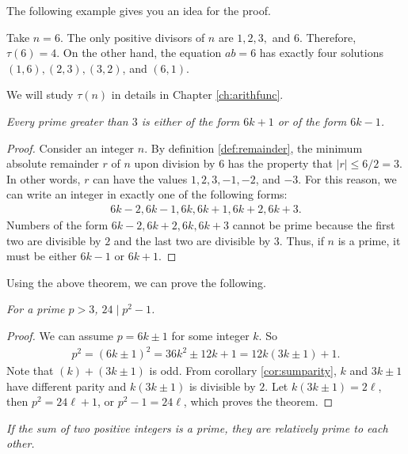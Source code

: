 \documentclass{subfile}
\begin{document}
	The following example gives you an idea for the proof.

	\begin{example}
		Take $n=6$. The only positive divisors of $n$ are $1,2,3,$ and $6$. Therefore, $\tau(6)=4$. On the other hand, the equation $ab=6$ has exactly four solutions $(1,6), (2,3),(3,2)$, and $(6,1)$.
	\end{example}

	We will study $\tau(n)$ in details in Chapter \autoref{ch:arithfunc}.

	\begin{theorem}\slshape
		Every prime greater than $3$ is either of the form $6k+1$ or of the form $6k-1$.
	\end{theorem}

	\begin{proof}
		Consider an integer $n$. By definition \eqref{def:remainder}, the minimum absolute remainder $r$ of $n$ upon division by $6$ has the property that $|r| \leq 6/2=3$. In other words, $r$ can have the values $1,2,3,-1,-2$, and $-3$. For this reason, we can write an integer in exactly one of the following forms:
		\begin{align*}
			6k-2,6k-1,6k,6k+1,6k+2,6k+3.
		\end{align*}
		Numbers of the form $6k-2, 6k+2, 6k, 6k+3$ cannot be prime because the first two are divisible by $2$ and the last two are divisible by $3$. Thus, if $n$ is a prime, it must be either $6k-1$ or $6k+1$.
	\end{proof}
	Using the above theorem, we can prove the following.
	\begin{theorem}\slshape
		For a prime $p>3$, $24\mid p^2-1$.
	\end{theorem}

	\begin{proof}
		We can assume $p=6k\pm1$ for some integer $k$. So
		\begin{align*}
			p^2 = (6k\pm1)^2 = 36k^2\pm12k+1 = 12k(3k\pm1)+1.
		\end{align*}
		Note that $(k)+(3k\pm1)$ is odd. From corollary \eqref{cor:sumparity}, $k$ and $3k\pm1$ have different parity and $k(3k\pm1)$ is divisible by $2$. Let $k(3k\pm1)=2\ell$, then $p^2=24\ell+1$, or $p^2-1=24\ell$, which proves the theorem.
	\end{proof}

	\begin{theorem}\slshape
		If the sum of two positive integers is a prime, they are relatively prime to each other.
	\end{theorem}
\end{document}
